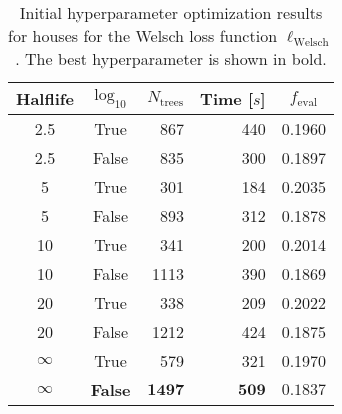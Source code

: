 \begin{table}[h!]
  \centerfloat
  \begin{tabular}{@{}ccrrc@{}}
    Halflife & $\log_{10}$ & $N_\mathrm{trees}$ & Time [$s$] & $f_\mathrm{eval}$ \\
    \midrule
    \num{2.5} & True & \num{867} & \num{440} & \num{0.1960} \\
    \num{2.5} & False & \num{835} & \num{300} & \num{0.1897} \\
    \num{5} & True & \num{301} & \num{184} & \num{0.2035} \\
    \num{5} & False & \num{893} & \num{312} & \num{0.1878} \\
    \num{10} & True & \num{341} & \num{200} & \num{0.2014} \\
    \num{10} & False & \num{1113} & \num{390} & \num{0.1869} \\
    \num{20} & True & \num{338} & \num{209} & \num{0.2022} \\
    \num{20} & False & \num{1212} & \num{424} & \num{0.1875} \\
    $\infty$ & True & \num{579} & \num{321} & \num{0.1970} \\
    $\bm{\infty}$ & \textbf{False} & $\mathbf{1497}$ & $\mathbf{509}$ & $\mathbf{0.1837}$ \\
  \end{tabular}
  \caption[Initial Hyperparameter Optimization Results for Houses -- Welsch Loss Function]{\label{tab:h:HPO_initial_Welsch-villa-appendix}Initial hyperparameter optimization results for houses for the Welsch loss function $\ell_\mathrm{Welsch}$. The best hyperparameter is shown in bold.}
\end{table}



